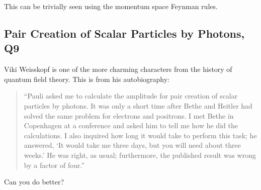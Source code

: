 \begin{solution}
    This can be trivially seen using the momentum space Feynman rules.
\end{solution}

\subsection{Pair Creation of Scalar Particles by Photons, Q9}

Viki Weisskopf is one of the more charming characters from the history of quantum field theory. This is from his autobiography:

\begin{quote}
    ``Pauli asked me to calculate the amplitude for pair creation of scalar particles by photons. It was only a short time after Bethe and Heitler had solved the same problem for electrons and positrons. I met Bethe in Copenhagen at a conference and asked him to tell me how he did the calculations. I also inquired how long it would take to perform this task; he answered, `It would take me three days, but you will need about three weeks.' He was right, as usual; furthermore, the published result was wrong by a factor of four.''
\end{quote}

Can you do better?

